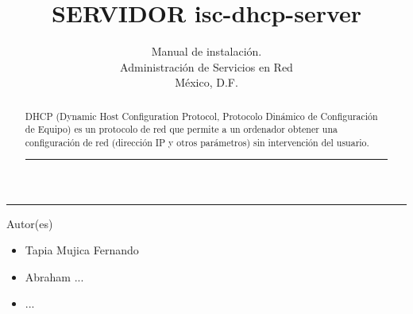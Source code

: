 \title{SERVIDOR isc-dhcp-server}
\author{Manual de instalación.\\
\small Administración de Servicios en Red\\
\small México, D.F.
}

\vspace{2cm}
\maketitle		
	\vspace*{-1cm}
	\begin{center}\rule{0.9\textwidth}{0.1mm}\end{center}
	\begin{abstract}
	\normalsize DHCP (Dynamic Host Configuration Protocol, Protocolo Dinámico de Configuración de Equipo) es un protocolo de red que permite a un ordenador obtener una configuración de red (dirección IP y otros parámetros) sin intervención del usuario.
	\begin{center}\rule{0.9\textwidth}{0.1mm}\end{center}
	\vspace*{0.5cm}
	\end{abstract}
	\vspace*{9cm}
\small Autor(es)
\begin{itemize}
	\item Tapia Mujica Fernando
	\item  Abraham ...
	\item ...
\end{itemize}